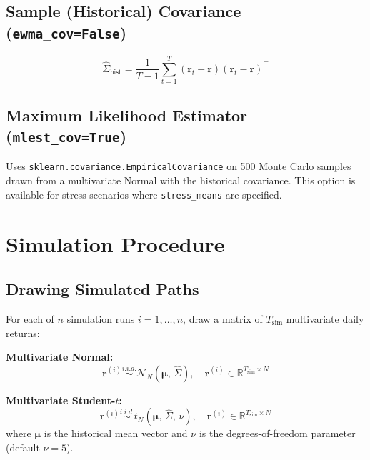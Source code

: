 \documentclass[11pt, a4paper]{article}
\begin{document}
\subsection{Sample (Historical) Covariance (\texttt{ewma\_cov=False})}

\begin{equation}
\hat{\Sigma}_{\text{hist}} = \frac{1}{T-1}
  \sum_{t=1}^{T} (\mathbf{r}_t - \bar{\mathbf{r}})(\mathbf{r}_t - \bar{\mathbf{r}})^\top
\end{equation}

\subsection{Maximum Likelihood Estimator (\texttt{mlest\_cov=True})}

Uses \texttt{sklearn.covariance.EmpiricalCovariance} on 500 Monte Carlo
samples drawn from a multivariate Normal with the historical covariance.
This option is available for stress scenarios where \texttt{stress\_means}
are specified.

\section{Simulation Procedure}

\subsection{Drawing Simulated Paths}

For each of $n$ simulation runs $i = 1, \ldots, n$, draw a matrix of
$T_{\text{sim}}$ multivariate daily returns:

\textbf{Multivariate Normal:}
\begin{equation}
\mathbf{r}^{(i)} \overset{i.i.d.}{\sim}
\mathcal{N}_N\!\left(\boldsymbol{\mu},\, \hat{\Sigma}\right),
\quad \mathbf{r}^{(i)} \in \mathbb{R}^{T_{\text{sim}} \times N}
\end{equation}

\textbf{Multivariate Student-$t$:}
\begin{equation}
\mathbf{r}^{(i)} \overset{i.i.d.}{\sim}
t_N\!\left(\boldsymbol{\mu},\, \hat{\Sigma},\, \nu\right),
\quad \mathbf{r}^{(i)} \in \mathbb{R}^{T_{\text{sim}} \times N}
\end{equation}
where $\boldsymbol{\mu}$ is the historical mean vector and $\nu$ is the
degrees-of-freedom parameter (default $\nu = 5$).
\end{document}
